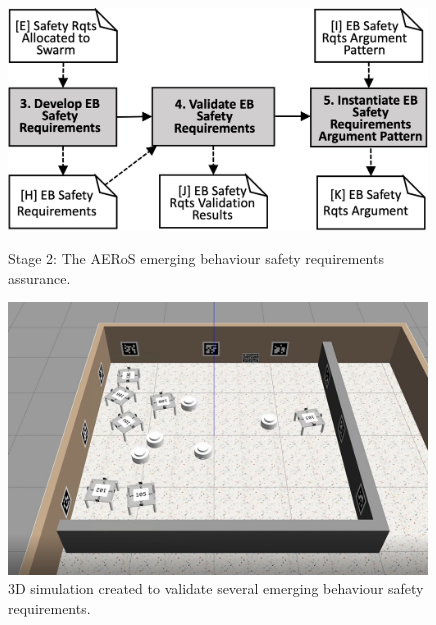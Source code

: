\documentclass[runningheads]{llncs}
\begin{document}
\begin{figure}[t]
	\centering
	\begin{minipage}[b]{.5\textwidth}
		\centering
		\includegraphics[width=0.99\textwidth]{figures/AERoS-Stage2.png}%
		\vspace{-2ex}
		\caption{Stage 2: The AERoS emerging behaviour safety requirements assurance.}%
	\label{amlas-a-stage2}
  \end{minipage}%
  \hspace*{0.03\textwidth}
\begin{minipage}[b]{.43\textwidth}
	\centering
	\includegraphics[trim={30mm 25mm 45mm 30mm},clip,width=0.99\textwidth]{figures/3Dsim.png}
	\vspace{-2ex}
	\caption{3D simulation created to validate several emerging behaviour safety requirements.}
	\label{3Dsim}
\end{minipage}
\vspace{-4ex}
\end{figure}
\end{document}
